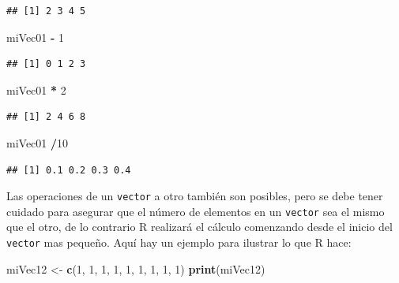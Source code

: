 \documentclass[
]{book}
\newenvironment{Shaded}{\begin{snugshade}}{\end{snugshade}}
\newcommand{\DecValTok}[1]{\textcolor[rgb]{0.00,0.00,0.81}{#1}}
\newcommand{\KeywordTok}[1]{\textcolor[rgb]{0.13,0.29,0.53}{\textbf{#1}}}
\newcommand{\NormalTok}[1]{#1}
\newcommand{\OperatorTok}[1]{\textcolor[rgb]{0.81,0.36,0.00}{\textbf{#1}}}
\newcommand{\StringTok}[1]{\textcolor[rgb]{0.31,0.60,0.02}{#1}}
\begin{document}
\begin{verbatim}
## [1] 2 3 4 5
\end{verbatim}

\begin{Shaded}
\begin{Highlighting}[]
\NormalTok{miVec01 }\OperatorTok{-}\StringTok{ }\DecValTok{1}
\end{Highlighting}
\end{Shaded}

\begin{verbatim}
## [1] 0 1 2 3
\end{verbatim}

\begin{Shaded}
\begin{Highlighting}[]
\NormalTok{miVec01 }\OperatorTok{*}\StringTok{ }\DecValTok{2}
\end{Highlighting}
\end{Shaded}

\begin{verbatim}
## [1] 2 4 6 8
\end{verbatim}

\begin{Shaded}
\begin{Highlighting}[]
\NormalTok{miVec01 }\OperatorTok{/}\DecValTok{10}
\end{Highlighting}
\end{Shaded}

\begin{verbatim}
## [1] 0.1 0.2 0.3 0.4
\end{verbatim}

Las operaciones de un \texttt{vector} a otro también son posibles, pero se debe tener cuidado para asegurar que el número de elementos en un \texttt{vector} sea el mismo que el otro, de lo contrario R realizará el cálculo comenzando desde el inicio del \texttt{vector} mas pequeño. Aquí hay un ejemplo para ilustrar lo que R hace:

\begin{Shaded}
\begin{Highlighting}[]
\NormalTok{miVec12 <-}\StringTok{ }\KeywordTok{c}\NormalTok{(}\DecValTok{1}\NormalTok{, }\DecValTok{1}\NormalTok{, }\DecValTok{1}\NormalTok{, }\DecValTok{1}\NormalTok{, }\DecValTok{1}\NormalTok{, }\DecValTok{1}\NormalTok{, }\DecValTok{1}\NormalTok{, }\DecValTok{1}\NormalTok{, }\DecValTok{1}\NormalTok{)}
\KeywordTok{print}\NormalTok{(miVec12)}
\end{Highlighting}
\end{Shaded}
\end{document}
